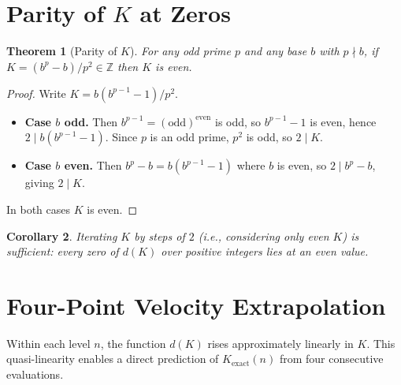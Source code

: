\documentclass[12pt,a4paper]{article}
\newtheorem{theorem}{Theorem}[section]
\newtheorem{corollary}[theorem]{Corollary}
\theoremstyle{definition}
\theoremstyle{remark}
\newcommand{\Z}{\mathbb{Z}}
\newcommand{\Kex}{K_{\mathrm{exact}}}
\begin{document}
\section{Parity of \texorpdfstring{$K$}{K} at Zeros}
\label{sec:parity}

\begin{theorem}[Parity of $K$]
\label{thm:parity}
For any odd prime $p$ and any base $b$ with $p \nmid b$, if
$K = (b^p - b)/p^2 \in \Z$ then $K$ is even.
\end{theorem}

\begin{proof}
Write $K = b(b^{p-1}-1)/p^2$.
\begin{itemize}[leftmargin=2em]
  \item \textbf{Case $b$ odd.} Then $b^{p-1} = (\text{odd})^{\text{even}}$
        is odd, so $b^{p-1}-1$ is even, hence $2 \mid b(b^{p-1}-1)$.
        Since $p$ is an odd prime, $p^2$ is odd, so $2 \mid K$.
  \item \textbf{Case $b$ even.} Then $b^p - b = b(b^{p-1}-1)$ where $b$
        is even, so $2 \mid b^p - b$, giving $2 \mid K$.
\end{itemize}
In both cases $K$ is even.
\end{proof}

\begin{corollary}
Iterating $K$ by steps of $2$ (i.e., considering only even $K$) is
sufficient: every zero of $d(K)$ over positive integers lies at an
even value.
\end{corollary}

\section{Four-Point Velocity Extrapolation}
\label{sec:algorithm}

Within each level $n$, the function $d(K)$ rises approximately linearly
in $K$. This quasi-linearity enables a direct prediction of $\Kex(n)$
from four consecutive evaluations.
\end{document}
